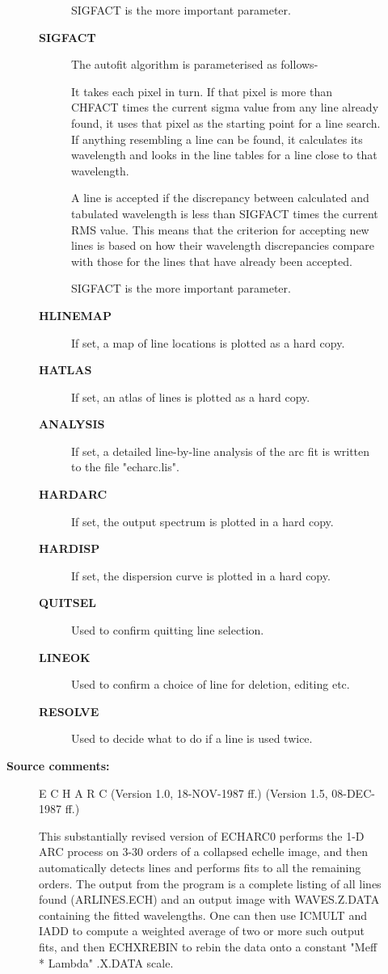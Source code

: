 \begin{description}
\begin{description}
\begin{description}
 SIGFACT is the more important parameter.
\item [\textbf{SIGFACT}]
 The autofit algorithm is parameterised as follows-

   It takes each pixel in turn.  If that pixel is more than CHFACT
   times the current sigma value from any line already found, it uses
   that pixel as the starting point for a line search.  If anything
   resembling a line can be found, it calculates its wavelength and
   looks in the line tables for a line close to that wavelength.

   A line is accepted if the discrepancy between calculated and
   tabulated wavelength is less than SIGFACT times the current RMS
   value.  This means that the criterion for accepting new lines
   is based on how their wavelength discrepancies compare with those for
   the lines that have already been accepted.

 SIGFACT is the more important parameter.
\item [\textbf{HLINEMAP}]
 If set, a map of line locations is plotted as a hard copy.
\item [\textbf{HATLAS}]
 If set, an atlas of lines is plotted as a hard copy.
\item [\textbf{ANALYSIS}]
 If set, a detailed line-by-line analysis of the arc fit is
 written to the file "echarc.lis".
\item [\textbf{HARDARC}]
 If set, the output spectrum is plotted in a hard copy.
\item [\textbf{HARDISP}]
 If set, the dispersion curve is plotted in a hard copy.
\item [\textbf{QUITSEL}]
 Used to confirm quitting line selection.
\item [\textbf{LINEOK}]
 Used to confirm a choice of line for deletion, editing etc.
\item [\textbf{RESOLVE}]
 Used to decide what to do if a line is used twice.
\end{description}

\item [\textbf{Source comments:}]
\begin{terminalv}
 E C H A R C                    (Version 1.0, 18-NOV-1987 ff.)
                                (Version 1.5, 08-DEC-1987 ff.)

 This substantially revised version of ECHARC0 performs the 1-D
 ARC process on 3-30 orders of a collapsed echelle image, and
 then automatically detects lines and performs fits to all the
 remaining orders.  The output from the program is a complete
 listing of all lines found (ARLINES.ECH) and an output image
 with WAVES.Z.DATA containing the fitted wavelengths.  One can
 then use ICMULT and IADD to compute a weighted average of two
 or more such output fits, and then ECHXREBIN to rebin the data
 onto a constant "Meff * Lambda" .X.DATA scale.


\end{terminalv}
\end{description}
\end{description}
